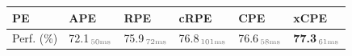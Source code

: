 \begin{tabular}{y{16mm}|x{12mm}x{12mm}x{12mm}x{12mm}x{12mm}}
\toprule
PE &APE &RPE &cRPE &CPE &xCPE \\\midrule
Perf. (\%) &72.1$\,_\text{\textcolor{darkgray}{50ms}}$ &75.9$\,_\text{\textcolor{darkgray}{72ms}}$ &76.8$\,_\text{\textcolor{darkgray}{101ms}}$ &76.6$\,_\text{\textcolor{darkgray}{58ms}}$ &\textbf{77.3}$\,_\text{\textcolor{darkgray}{61ms}}$ \\
\bottomrule
\end{tabular}
